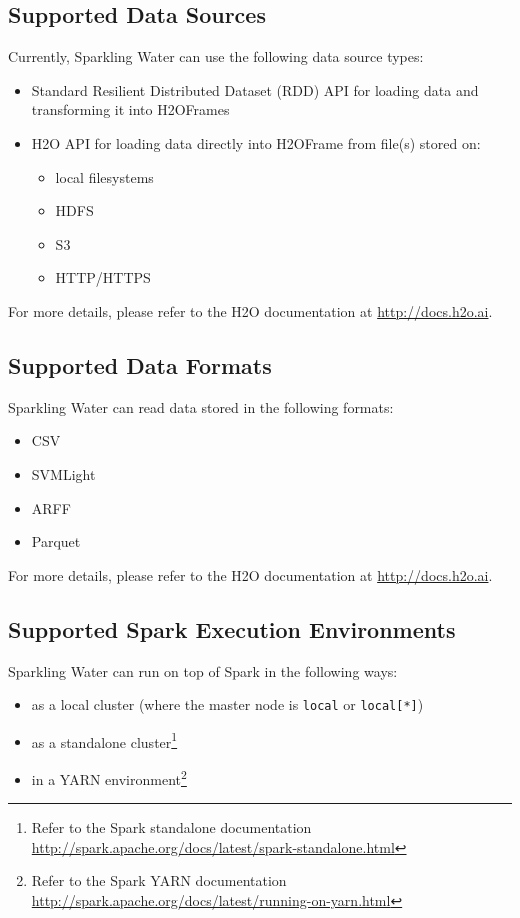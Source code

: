 \documentclass{standalone}
\begin{document}
\subsection{Supported Data Sources}

Currently, Sparkling Water can use the following data source types:

\begin{itemize}

 \item Standard Resilient Distributed Dataset (RDD) API for loading data and transforming it into H2OFrames
 \item H2O API for loading data directly into H2OFrame from file(s) stored on:
  \begin{itemize}
    \item local filesystems
    \item HDFS
    \item S3
    \item HTTP/HTTPS
  \end{itemize}
\end{itemize}

For more details, please refer to the H2O documentation at {\url{http://docs.h2o.ai}}.

\subsection{Supported Data Formats}

Sparkling Water can read data stored in the following formats:

\begin{itemize}

  \item CSV
  \item SVMLight
  \item ARFF
  \item Parquet
\end{itemize}

For more details, please refer to the H2O documentation at {\url{http://docs.h2o.ai}}.

\subsection{Supported Spark Execution Environments}
Sparkling Water can run on top of Spark in the following ways:
\begin{itemize}
  \item as a local cluster (where the master node is \texttt{local} or \texttt{local[*]})
  \item as a standalone cluster\footnote{Refer to the Spark standalone documentation
\url{http://spark.apache.org/docs/latest/spark-standalone.html}} 
\item in a YARN environment\footnote{Refer to the Spark YARN documentation \url{http://spark.apache.org/docs/latest/running-on-yarn.html}}

\end{itemize}
\end{document}
